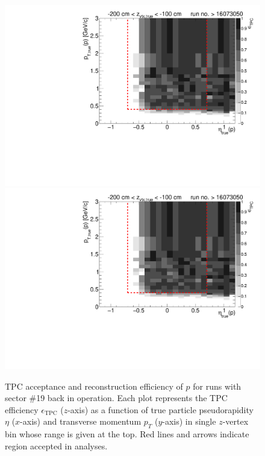 \begin{figure}[hb]
	\caption[TPC acceptance and reconstruction efficiency of $p$ for runs with sector \#19 back in operation.]{TPC acceptance and reconstruction efficiency of $p$ for runs with sector \#19 back in operation. Each plot represents the TPC efficiency $\epsilon_{\text{TPC}}$ ($z$-axis) as a function of true particle pseudorapidity $\eta$ ($x$-axis) and transverse momentum $p_{T}$ ($y$-axis) in single $z$-vertex bin whose range is given at the top. Red lines and arrows indicate region accepted in analyses.}\label{fig:tpcEff_proton_plus1}
	\centering
	\parbox{0.495\textwidth}{
		\centering
		\includegraphics[width=\linewidth,page=3]{graphics/eff/Eff2D_TPC_proton_Plus_RunRange2.pdf}\\
		\includegraphics[width=\linewidth,page=5]{graphics/eff/Eff2D_TPC_proton_Plus_RunRange2.pdf}\\
}
\end{figure}
